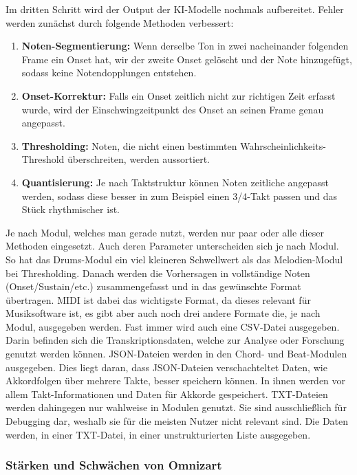 Im dritten Schritt wird der Output der KI-Modelle nochmals aufbereitet.
Fehler werden zunächst durch folgende Methoden verbessert:
\begin{enumerate}
    \item \textbf{Noten-Segmentierung:} Wenn derselbe Ton in zwei nacheinander folgenden Frame ein Onset hat, wir der zweite Onset gelöscht und der Note hinzugefügt, sodass keine Notendopplungen entstehen.
    \item \textbf{Onset-Korrektur:} Falls ein Onset zeitlich nicht zur richtigen Zeit erfasst wurde, wird der Einschwingzeitpunkt des Onset an seinen Frame genau angepasst.
    \item \textbf{Thresholding:} Noten, die nicht einen bestimmten Wahrscheinlichkeits-Threshold überschreiten, werden aussortiert.
    \item \textbf{Quantisierung:} Je nach Taktstruktur können Noten zeitliche angepasst werden, sodass diese besser in zum Beispiel einen 3/4-Takt passen und das Stück rhythmischer ist.
\end{enumerate}
Je nach Modul, welches man gerade nutzt, werden nur paar oder alle dieser Methoden eingesetzt.
Auch deren Parameter unterscheiden sich je nach Modul.
So hat das Drums-Modul ein viel kleineren Schwellwert als das Melodien-Modul bei Thresholding.
Danach werden die Vorhersagen in vollständige Noten (Onset/Sustain/etc.)
zusammengefasst und in das gewünschte Format übertragen.
MIDI ist dabei das wichtigste Format, da dieses relevant für Musiksoftware ist,
es gibt aber auch noch drei andere Formate die, je nach Modul, ausgegeben werden.
Fast immer wird auch eine CSV-Datei ausgegeben.
Darin befinden sich die Transkriptionsdaten, welche zur Analyse oder Forschung genutzt werden können.
JSON-Dateien werden in den Chord- und Beat-Modulen ausgegeben.
Dies liegt daran, dass JSON-Dateien verschachteltet Daten, wie Akkordfolgen über mehrere Takte, besser speichern können.
In ihnen werden vor allem Takt-Informationen und Daten für Akkorde gespeichert.
TXT-Dateien werden dahingegen nur wahlweise in Modulen genutzt.
Sie sind ausschließlich für Debugging dar, weshalb sie für die meisten Nutzer nicht relevant sind.
Die Daten werden, in einer TXT-Datei, in einer unstrukturierten Liste ausgegeben.

\subsubsection{Stärken und Schwächen von Omnizart}

